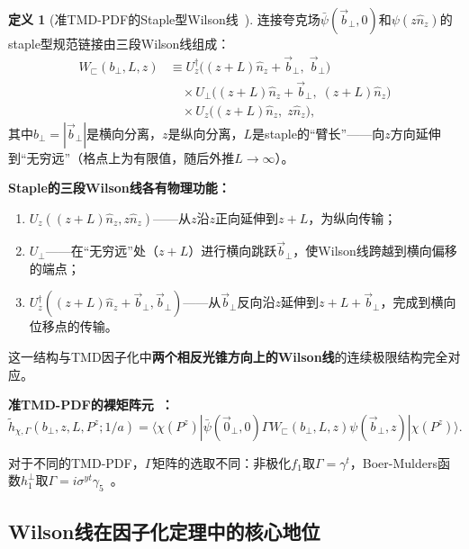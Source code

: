 \documentclass[12pt,a4paper]{ctexart}
\theoremstyle{definition}
\newtheorem{definition}{定义}[section]
\begin{document}
\begin{definition}[准TMD-PDF的Staple型Wilson线~\cite{Zhang2022renormTMD}]
连接夸克场$\bar\psi(\vec{b}_\perp, 0)$和$\psi(z\hat n_z)$的staple型规范链接由三段Wilson线组成：
\begin{equation}
\begin{aligned}
W_{\sqsubset}(b_\perp, L, z) &\equiv U_z^\dagger\big((z+L)\hat n_z + \vec{b}_\perp,\; \vec{b}_\perp\big) \\
&\quad \times U_\perp\big((z+L)\hat n_z + \vec{b}_\perp,\; (z+L)\hat n_z\big) \\
&\quad \times U_z\big((z+L)\hat n_z,\; z\hat n_z\big),
\end{aligned}
\label{eq:staple_WL}
\end{equation}
其中$b_\perp = |\vec{b}_\perp|$是横向分离，$z$是纵向分离，$L$是staple的``臂长''——向$z$方向延伸到``无穷远''（格点上为有限值，随后外推$L\to\infty$）。
\end{definition}

\textbf{Staple的三段Wilson线各有物理功能：}
\begin{enumerate}[nosep]
    \item $U_z((z+L)\hat n_z, z\hat n_z)$——从$z$沿$z$正向延伸到$z+L$，为纵向传输；
    \item $U_\perp$——在``无穷远''处（$z+L$）进行横向跳跃$\vec{b}_\perp$，使Wilson线跨越到横向偏移的端点；
    \item $U_z^\dagger((z+L)\hat n_z+\vec{b}_\perp, \vec{b}_\perp)$——从$\vec{b}_\perp$反向沿$z$延伸到$z+L+\vec{b}_\perp$，完成到横向位移点的传输。
\end{enumerate}
这一结构与TMD因子化中\textbf{两个相反光锥方向上的Wilson线}的连续极限结构完全对应。

\textbf{准TMD-PDF的裸矩阵元~\cite{Zhang2022renormTMD}：}
\begin{equation}
\tilde{h}_{\chi,\Gamma}(b_\perp, z, L, P^z; 1/a) = \langle \chi(P^z) | \bar\psi(\vec{0}_\perp, 0) \Gamma W_{\sqsubset}(b_\perp, L, z) \psi(\vec{b}_\perp, z) | \chi(P^z) \rangle.
\label{eq:bare_TMD_matrix}
\end{equation}

对于不同的TMD-PDF，$\Gamma$矩阵的选取不同：非极化$f_1$取$\Gamma = \gamma^t$，Boer-Mulders函数$h_1^\perp$取$\Gamma = i\sigma^{yt}\gamma_5$~\cite{Ma2025BoerMulders}。

\subsection{Wilson线在因子化定理中的核心地位}
\end{document}
